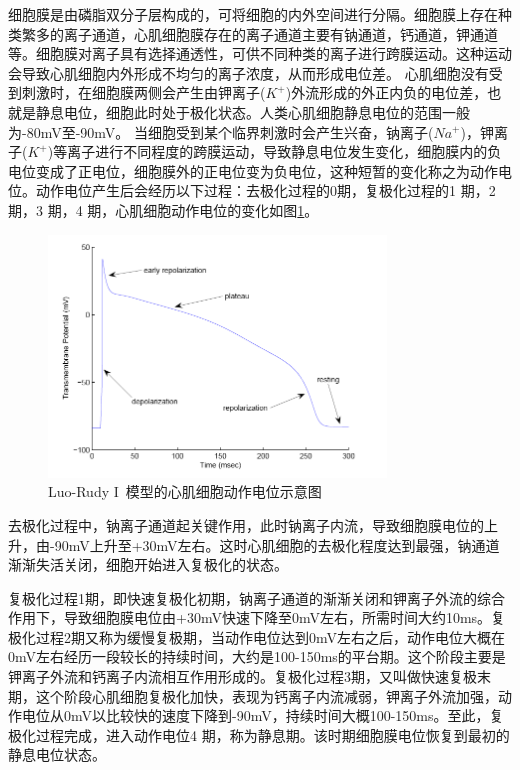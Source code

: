 \documentclass[twoside,UTF8]{nputhesis}
\begin{document}
细胞膜是由磷脂双分子层构成的，可将细胞的内外空间进行分隔。细胞膜上存在种类繁多的离子通道，心肌细胞膜存在的离子通道主要有钠通道，钙通道，钾通道等。细胞膜对离子具有选择通透性，可供不同种类的离子进行跨膜运动。这种运动会导致心肌细胞内外形成不均匀的离子浓度，从而形成电位差。
心肌细胞没有受到刺激时，在细胞膜两侧会产生由钾离子($K^+$)外流形成的外正内负的电位差，也就是静息电位，细胞此时处于极化状态。人类心肌细胞静息电位的范围一般为-80mV至-90mV。 当细胞受到某个临界刺激时会产生兴奋，钠离子($Na^+$)，钾离子($K^+$)等离子进行不同程度的跨膜运动，导致静息电位发生变化，细胞膜内的负电位变成了正电位，细胞膜外的正电位变为负电位，这种短暂的变化称之为动作电位。动作电位产生后会经历以下过程：去极化过程的0期，复极化过程的1 期，2 期，3 期，4 期\cite{Sachse2004}，心肌细胞动作电位的变化如图\ref{f1}。
\begin{figure}[ht]
	\centering
	\includegraphics[width=0.8\textwidth,height=0.5\textwidth]{figures/LUO.png}
	\hspace{0.04\textwidth}
	\caption{Luo-Rudy I~模型的心肌细胞动作电位示意图\cite{Ying2005}}
	\label{f1} 
\end{figure}

去极化过程中，钠离子通道起关键作用，此时钠离子内流，导致细胞膜电位的上升，由-90mV上升至+30mV左右。这时心肌细胞的去极化程度达到最强，钠通道渐渐失活关闭，细胞开始进入复极化的状态。

复极化过程1期，即快速复极化初期，钠离子通道的渐渐关闭和钾离子外流的综合作用下，导致细胞膜电位由+30mV快速下降至0mV左右，所需时间大约10ms。复极化过程2期又称为缓慢复极期，当动作电位达到0mV左右之后，动作电位大概在0mV左右经历一段较长的持续时间，大约是100-150ms的平台期。这个阶段主要是钾离子外流和钙离子内流相互作用形成的。复极化过程3期，又叫做快速复极末期，这个阶段心肌细胞复极化加快，表现为钙离子内流减弱，钾离子外流加强，动作电位从0mV以比较快的速度下降到-90mV，持续时间大概100-150ms。至此，复极化过程完成，进入动作电位4 期，称为静息期。该时期细胞膜电位恢复到最初的静息电位状态。
\end{document}
